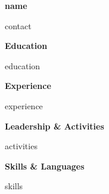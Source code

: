 \documentclass[11pt]{article}
\begin{document}
\begin{center}
    \textbf{\Large {{name}}}\\
    \hrulefill
\end{center}

\begin{center}
    {{contact}}
\end{center}

\vspace{0.5pt}

\begin{center}
    \textbf{Education}
\end{center}
{{education}}

\vspace{12pt}

\begin{center}
    \textbf{Experience}
\end{center}
{{experience}}

\begin{center}
    \textbf{Leadership \& Activities}
\end{center}
{{activities}}

\begin{center}
    \textbf{Skills \& Languages}
\end{center}
{{skills}}
\end{document}
